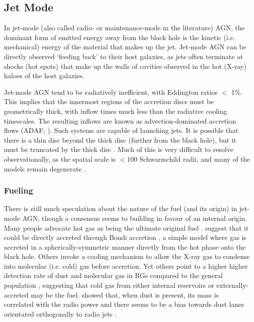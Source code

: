 	\subsection{Jet Mode}
		\label{subsec:Jet}
		In jet-mode (also called radio- or maintenance-mode in the literature) AGN, the dominant form of emitted energy away from the black hole is the kinetic (i.e. mechanical) energy of the material that makes up the jet. Jet-mode AGN can be directly observed `feeding back' to their host galaxies, as jets often terminate at shocks (hot spots) that make up the walls of cavities observed in the hot (X-ray) haloes of the host galaxies.

		Jet-mode AGN tend to be radiatively inefficient, with Eddington ratios $<$ 1\%. This implies that the innermost regions of the accretion discs must be geometrically thick, with inflow times much less than the radiative cooling timescales. The resulting inflows are known as advection-dominated accretion flows (ADAF; \citealt{Narayan1994}). Such systems are capable of launching jets. It is possible that there is a thin disc beyond the thick disc (further from the black hole), but it must be truncated by the thick disc \cite[e.g.][]{Abramowicz2002, Sadler2014}. Much of this is very difficult to resolve observationally, as the spatial scale is $< 100$ Schwarzschild radii, and many of the models remain degenerate \citep[e.g.][]{Quataert1999}. 

		\subsubsection{Fueling}
			\label{subsubsec:JetFueling}
			There is still much speculation about the nature of the fuel (and its origin) in jet-mode AGN, though a consensus seems to building in favour of an internal origin. Many people advocate hot gas as being the ultimate original fuel \citep[e.g.][]{Allen2006}. \citet{Hardcastle2007a} suggest that it could be directly accreted through Bondi accretion \citep{Bondi1952}, a simple model where gas is accreted in a spherically-symmetric manner directly from the hot phase onto the black hole. Others invoke a cooling mechanism to allow the X-ray gas to condense into molecular (i.e. cold) gas before accretion. Yet others point to a higher higher detection rate of dust and molecular gas in RGs compared to the general population \citep[e.g.][]{Lim2000, DeRuiter2002,Lim2003, VerdoesKleijn2005}, suggesting that cold gas from either internal reservoirs or externally-accreted may be the fuel. \citet{DeRuiter2002} showed that, when dust is present, its mass is correlated with the radio power and there seems to be a bias towards dust lanes orientated orthogonally to radio jets \citep{VerdoesKleijn2005}.

